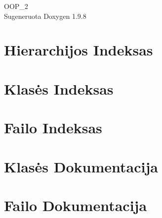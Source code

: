 \documentclass[twoside]{book}
\newcommand{\+}{\discretionary{\mbox{\scriptsize$\hookleftarrow$}}{}{}}
\newcommand{\clearemptydoublepage}{%
    \newpage{\pagestyle{empty}\cleardoublepage}%
  }
\begin{document}
  \raggedbottom
    \hypersetup{pageanchor=false,
                bookmarksnumbered=true,
                pdfencoding=unicode
               }
  \begin{titlepage}
  \vspace*{7cm}
  \begin{center}%
  {\Large OOP\+\_\+2}\\
  \vspace*{1cm}
  {\large Sugeneruota Doxygen 1.9.8}\\
  \end{center}
  \end{titlepage}
  \clearemptydoublepage
  \tableofcontents
  \clearemptydoublepage
  \hypersetup{pageanchor=true}
\chapter{Hierarchijos Indeksas}

\chapter{Klasės Indeksas}

\chapter{Failo Indeksas}

\chapter{Klasės Dokumentacija}


\chapter{Failo Dokumentacija}








  \backmatter
  \newpage
  \clearemptydoublepage
  \printindex
\end{document}
